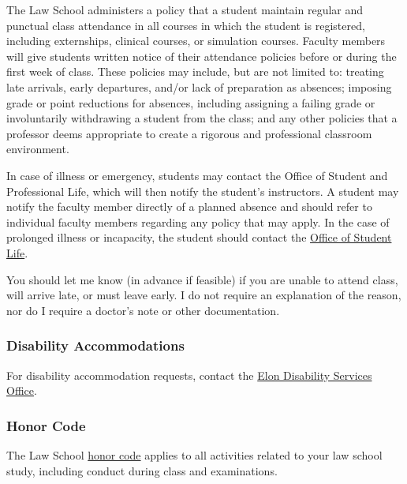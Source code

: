 \documentclass[11pt,letterpaper,twoside]{article}
\renewenvironment{quote}{%
   \list{}{%
     \leftmargin2em   %
     \rightmargin\leftmargin\parsep .1em }
   \item\relax
}
{\endlist}
\begin{document}
\begin{quote}
The Law School administers a policy that a student maintain regular and
punctual class attendance in all courses in which the student is
registered, including externships, clinical courses, or simulation
courses. Faculty members will give students written notice of their
attendance policies before or during the first week of class. These
policies may include, but are not limited to: treating late arrivals,
early departures, and/or lack of preparation as absences; imposing grade
or point reductions for absences, including assigning a failing grade or
involuntarily withdrawing a student from the class; and any other
policies that a professor deems appropriate to create a rigorous and
professional classroom environment.

In case of illness or emergency, students may contact the Office of
Student and Professional Life, which will then notify the student's
instructors. A student may notify the faculty member directly of a
planned absence and should refer to individual faculty members regarding
any policy that may apply. In the case of prolonged illness or
incapacity, the student should contact the
\href{https://www.elon.edu/u/law/students/}{Office of Student Life}.
\end{quote}

You should let me know (in advance if feasible) if you are unable to
attend class, will arrive late, or must leave early. I do not require an
explanation of the reason, nor do I require a doctor's note or other
documentation.

\subsubsection{Disability
Accommodations}\label{disability-accommodations}

For disability accommodation requests, contact the
\href{https://www.elon.edu/u/academics/koenigsberger-learning-center/disabilities-resources/homepage/graduate-student-resources/}{Elon
Disability Services Office}.

\subsubsection{Honor Code}\label{honor-code}

The Law School
\href{https://www.elon.edu/u/law/students/honor-code/}{honor code}
applies to all activities related to your law school study, including
conduct during class and examinations.
\end{document}
